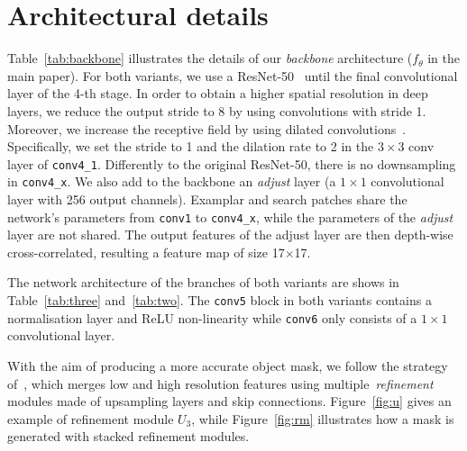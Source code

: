 \appendix
\section{Architectural details}
\label{sec:appendix_architecture}
Table~\ref{tab:backbone} illustrates the details of our \emph{backbone} architecture ($f_{\theta}$ in the main paper).
For both variants, we use a ResNet-50~\cite{he2016deep} until the final convolutional layer of the 4-th stage.
In order to obtain a higher spatial resolution in deep layers, we reduce the output stride to 8 by using convolutions with stride 1. 
Moreover, we increase the receptive field by using dilated convolutions~\cite{chen2018deeplab}.
Specifically, we set the stride to 1 and the dilation rate to 2 in the $3{\times}3$ conv layer of \texttt{conv4\_1}. 
Differently to the original ResNet-50, there is no downsampling in \texttt{conv4\_x}.
We also add to the backbone an \emph{adjust} layer (a $1{\times}1$ convolutional layer with 256 output channels). 
Examplar and search patches share the network's parameters from \texttt{conv1} to \texttt{conv4\_x}, while the parameters of the \textit{adjust} layer are not shared.
The output features of the adjust layer are then depth-wise cross-correlated, resulting a feature map of size 17{$\times$}17.

The network architecture of the branches of both variants are shows in Table~\ref{tab:three} and~\ref{tab:two}.
The \texttt{conv5} block in both variants contains a normalisation layer and ReLU non-linearity while \texttt{conv6} only consists of a $1{\times}1$ convolutional layer.

With the aim of producing a more accurate object mask, we follow the strategy of~\cite{SharpMask}, which merges low and high resolution features using multiple~\textit{refinement} modules made of upsampling layers and skip connections.
Figure~\ref{fig:u} gives an example of refinement module $U_3$, while Figure~\ref{fig:rm} illustrates how a mask is generated with stacked refinement modules.



